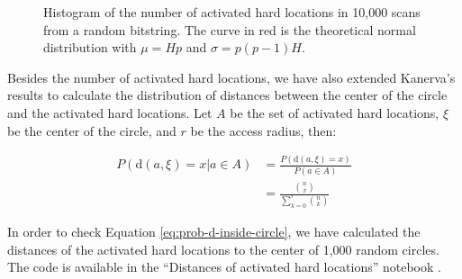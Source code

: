 \begin{figure}[!htb]
  \centering

  \caption{Histogram of the number of activated hard locations in 10,000 scans from a random bitstring. The curve in red is the theoretical normal distribution with $\mu = Hp$ and $\sigma = p(p-1)H$.}
  \label{fig:validation-activated-hls}
\end{figure}

Besides the number of activated hard locations, we have also extended Kanerva's results to calculate the distribution of distances between the center of the circle and the activated hard locations. Let $A$ be the set of activated hard locations, $\xi$ be the center of the circle, and $r$ be the access radius, then:

\begin{align}
P(\text{d}(a, \xi)=x | a \in A) &= \frac{P(\text{d}(a, \xi)=x)}{P(a \in A)} \\
    &= \frac{\binom{n}{x}}{\sum_{k=0}^r \binom{n}{k}} \label{eq:prob-d-inside-circle}
\end{align}

In order to check Equation \ref{eq:prob-d-inside-circle}, we have calculated the distances of the activated hard locations to the center of 1,000 random circles. The code is available in the ``Distances of activated hard locations'' notebook \citep{sdmframework}.

